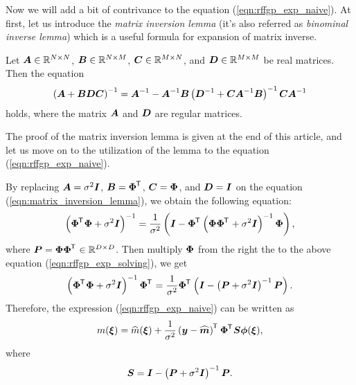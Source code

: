 \documentclass[twocolumn,a4paper,10pt]{article}
\begin{document}
Now we will add a bit of contrivance to the equation (\ref{eqn:rffgp_exp_naive}).
At first, let us introduce the \textit{matrix inversion lemma} (it's also referred as
\textit{binominal inverse lemma}) which is a useful formula for expansion of matrix inverse.  

\begin{theorem}
    Let
    $\boldsymbol{A} \in \mathbb{R}^{N \times N}$,
    $\boldsymbol{B} \in \mathbb{R}^{N \times M}$,
    $\boldsymbol{C} \in \mathbb{R}^{M \times N}$,
    and
    $\boldsymbol{D} \in \mathbb{R}^{M \times M}$
    be real matrices. Then the equation
    \begin{equation}
        \left( \boldsymbol{A} + \boldsymbol{BDC} \right)^{-1} = \boldsymbol{A}^{-1} - \boldsymbol{A}^{-1} \boldsymbol{B}
        \left( \boldsymbol{D}^{-1} + \boldsymbol{CA}^{-1} \boldsymbol{B} \right)^{-1} \boldsymbol{CA}^{-1}
        \label{eqn:matrix_inversion_lemma}
    \end{equation}
    holds, where the matrix $\boldsymbol{A}$ and $\boldsymbol{D}$ are regular matrices.
\end{theorem}

The proof of the matrix inversion lemma is given at the end of this article,
and let us move on to the utilization of the lemma to the equation (\ref{eqn:rffgp_exp_naive}).

By replacing $\boldsymbol{A} = \sigma^2 \boldsymbol{I}$, $\boldsymbol{B} = \boldsymbol{\Phi}^{\mkern-1.5mu\mathsf{T}}\hspace{0.5pt}$, $\boldsymbol{C} = \boldsymbol{\Phi}$,
and $\boldsymbol{D} = \boldsymbol{I}$ on the equation (\ref{eqn:matrix_inversion_lemma}),
we obtain the following equation:
\begin{equation}
    \left( \boldsymbol{\Phi}^{\mkern-1.5mu\mathsf{T}}\hspace{0.5pt} \boldsymbol{\Phi} + \sigma^2 \boldsymbol{I} \right)^{-1}
    = \frac{1}{\sigma^2} \left (\boldsymbol{I} - \boldsymbol{\Phi}^{\mkern-1.5mu\mathsf{T}}\hspace{0.5pt}
    \left( \boldsymbol{\Phi \Phi}^{\mkern-1.5mu\mathsf{T}}\hspace{0.5pt} + \sigma^2 \boldsymbol{I} \right)^{-1} \boldsymbol{\Phi} \right),
    \label{eqn:rffgp_exp_solving}
\end{equation}
where $\boldsymbol{P} = \boldsymbol{\Phi \Phi}^{\mkern-1.5mu\mathsf{T}}\hspace{0.5pt} \in \mathbb{R}^{D \times D}$.
Then multiply $\boldsymbol{\Phi}$ from the right the to the above equation (\ref{eqn:rffgp_exp_solving}),
we get
\begin{equation}
    \left( \boldsymbol{\Phi}^{\mkern-1.5mu\mathsf{T}}\hspace{0.5pt} \boldsymbol{\Phi} + \sigma^2 \boldsymbol{I} \right)^{-1} \boldsymbol{\Phi}^{\mkern-1.5mu\mathsf{T}}\hspace{0.5pt}
    = \frac{1}{\sigma^2} \boldsymbol{\Phi}^{\mkern-1.5mu\mathsf{T}}\hspace{0.5pt}
    \left( \boldsymbol{I} - \left( \boldsymbol{P} + \sigma^2 \boldsymbol{I} \right)^{-1} \boldsymbol{P} \right).
    \label{eqn:rff_key_eqn}
\end{equation}
Therefore, the expression (\ref{eqn:rffgp_exp_naive}) can be written as
\begin{equation}
    m (\boldsymbol{\xi}) = \widehat{m} (\boldsymbol{\xi}) + \frac{1}{\sigma^2}
    \left( \boldsymbol{y} - \widehat{\boldsymbol{m}} \right)^{\mkern-1.5mu\mathsf{T}}\hspace{0.5pt} \boldsymbol{\Phi}^{\mkern-1.5mu\mathsf{T}}\hspace{0.5pt} \boldsymbol{S} \boldsymbol{\phi}(\boldsymbol{\xi}),
    \label{eqn:rffgp_exp}
\end{equation}
where
\begin{equation}
    \boldsymbol{S} = \boldsymbol{I} - \left( \boldsymbol{P} + \sigma^2 \boldsymbol{I} \right)^{-1} \boldsymbol{P}.
    \label{eqn:rffgp_exp_cache}
\end{equation}
\end{document}
